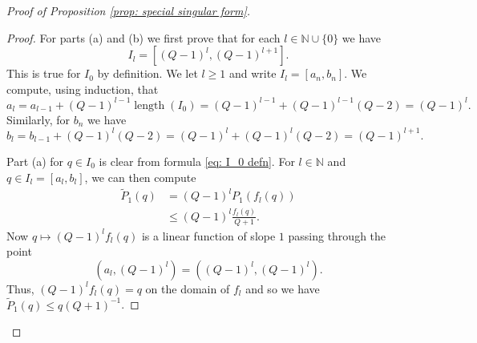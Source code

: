 \documentclass[reqno,11pt, twoside]{amsart}
\theoremstyle{plain}
\theoremstyle{definition}
\theoremstyle{definition}
\theoremstyle{remark}
\numberwithin{equation}{section}
\newcommand{\N}{{\mathbb{N}}}
\newcommand\on[1]{\operatorname{#1}}
\begin{document}
\begin{proof}[Proof of Proposition \ref{prop: special singular form}]
\begin{proof}
        For parts (a) and (b) we first prove that for each $l \in \N \cup \{0\}$ we have
        \begin{equation*}
            I_l = \left[(Q-1)^l, (Q-1)^{l+1} \right].
        \end{equation*}
        This is true for $I_0$ by definition. We let $l \geq 1$ and write $I_l = [a_n,b_n]$. We compute, using induction, that
        \begin{equation*}
            a_l = a_{l-1} + (Q-1)^{l-1} \on{length}(I_0) = (Q-1)^{l-1} + (Q-1)^{l-1}(Q-2) =  (Q-1)^l.
        \end{equation*}
        Similarly, for $b_n$ we have
        \begin{equation*}
            b_l = b_{l-1} + (Q-1)^l (Q-2) = (Q-1)^l + (Q-1)^l(Q-2) = (Q-1)^{l+1}.
        \end{equation*}

        Part (a) for $q \in I_0$ is clear from formula \eqref{eq: I_0 defn}. For  $l \in \N$ and $q \in I_l = [a_l,b_l]$, we can then compute
        \begin{equation*}
        \begin{split}
            \widetilde{P}_1(q) &= (Q-1)^lP_1(f_l(q)) \\
            &\leq (Q-1)^l \frac{f_l(q)}{Q+1}.
        \end{split}
        \end{equation*}
        Now $q \mapsto (Q-1)^l f_l(q)$ is a linear function of slope $1$ passing through the point
        \begin{equation*}
            (a_l, (Q-1)^l) = ((Q-1)^l, (Q-1)^l).
        \end{equation*}
        Thus, $(Q-1)^l f_l(q) = q$ on the domain of $f_l$ and so we have $\widetilde{P}_1(q) \leq q (Q+1)^{-1}$.


\end{proof}
\end{proof}
\end{document}
